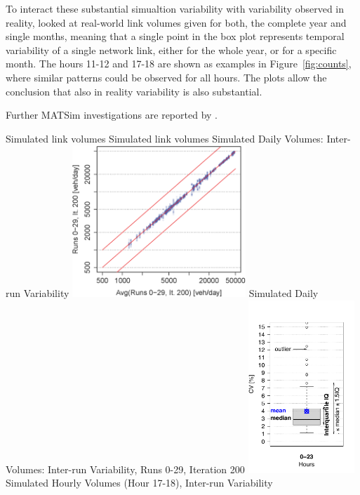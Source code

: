 To interact these substantial simualtion variability with variability observed in reality, \citet[][]{HorniEtAl_STRC_2011} looked at real-world link volumes given for both, the complete year and single months, meaning that a single point in the box plot represents temporal variability of a single network link, either for the whole year, or for a specific month. The hours 11-12 and 17-18 are shown as examples in Figure~\ref{fig:counts}, where similar patterns could be observed for all hours. The plots allow the conclusion that also in reality variability is also substantial.

Further MATSim investigations are reported by \citet[][]{Hackney_PhDThesis_2009, Neumann_PhDThesis_2014}.

\createfigure%
{Simulated link volumes}%
{Simulated link volumes}%
{\label{fig:linkVolumes}}%
{%
  \createsubfigure%
  {Simulated Daily Volumes: Inter-run Variability}%
	{\includegraphics[width=0.49\textwidth]{understanding/figures/var/linkVolumesAWTVInterScatter.png}}%
	{\label{fig:linkVolumesAWTVInterScatter}}%
  {}%
	\createsubfigure%
  {Simulated Daily Volumes: Inter-run Variability, Runs 0-29, Iteration 200}%
	{\includegraphics[width=0.3\textwidth]{understanding/figures/var/linkVolumesInterAWTV200.pdf}}%
	{\label{fig:linkVolumesInterAWTV200}}%
  {}%
  \createsubfigure%
  {Simulated Hourly Volumes (Hour 17-18), Inter-run Variability}%
}
